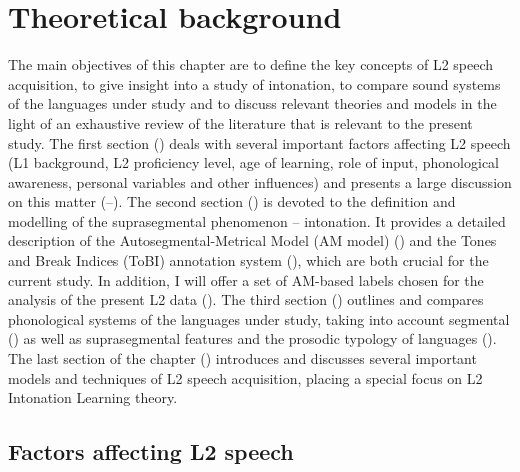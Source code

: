 \chapter{Theoretical background}\label{ch:2}

The main objectives of this chapter are to define the key concepts of L2 speech acquisition, to give insight into a study of intonation, to compare sound systems of the languages under study and to discuss relevant theories and models in the light of an exhaustive review of the literature that is relevant to the present study. The first section () deals with several important factors affecting L2 speech (L1 background, L2 proficiency level, age of learning, role of input, phonological awareness, personal variables and other influences) and presents a large discussion on this matter (--). The second section () is devoted to the definition and modelling of the suprasegmental phenomenon -- intonation. It provides a detailed description of the Autosegmental-Metrical Model (AM model) () and the Tones and Break Indices (ToBI) annotation system (), which are both crucial for the current study. In addition, I will offer a set of AM-based labels chosen for the analysis of the present L2 data (). The third section () outlines and compares phonological systems of the languages under study, taking into account segmental () as well as suprasegmental features and the prosodic typology of languages (). The last section of the chapter () introduces and discusses several important models and techniques of L2 speech acquisition, placing a special focus on  L2 Intonation Learning theory.

\section{Factors affecting L2 speech}\label{sec:2.1}

